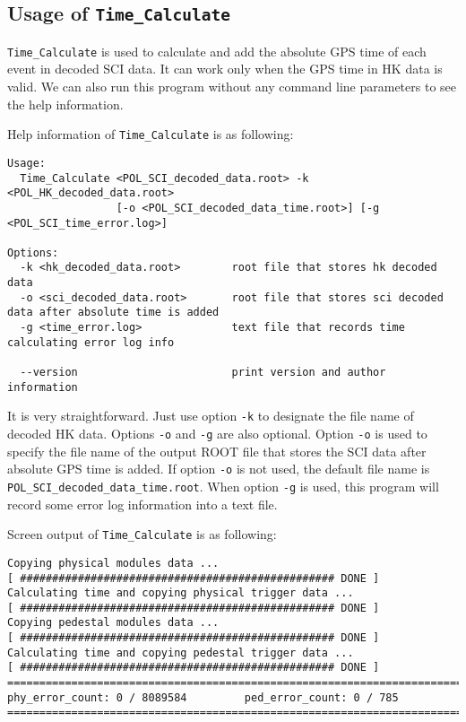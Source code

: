 \documentclass[a4paper, 12pt, onecolumn]{article}
\begin{document}
\subsection{Usage of \texttt{Time\_Calculate}}
\texttt{Time\_Calculate} is used to calculate and add the absolute GPS time of each event in decoded SCI data.
It can work only when the GPS time in HK data is valid. We can also run this program without any command line parameters to see the help information.

Help information of \texttt{Time\_Calculate} is as following:
\begin{Verbatim}[fontsize=\tiny, frame=single]
Usage:
  Time_Calculate <POL_SCI_decoded_data.root> -k <POL_HK_decoded_data.root>
                 [-o <POL_SCI_decoded_data_time.root>] [-g <POL_SCI_time_error.log>]

Options:
  -k <hk_decoded_data.root>        root file that stores hk decoded data
  -o <sci_decoded_data.root>       root file that stores sci decoded data after absolute time is added
  -g <time_error.log>              text file that records time calculating error log info

  --version                        print version and author information
\end{Verbatim}

It is very straightforward. Just use option \texttt{-k} to designate the file name of decoded HK data.
Options \texttt{-o} and \texttt{-g} are also optional. Option \texttt{-o} is used to specify the file name of the output ROOT file that stores the SCI data after
absolute GPS time is added. If option \texttt{-o} is not used, the default file name is \texttt{POL\_SCI\_decoded\_data\_time.root}.
When option \texttt{-g} is used, this program will record some error log information into a text file.

Screen output of \texttt{Time\_Calculate} is as following:

\begin{Verbatim}[fontsize=\scriptsize, frame=single]
Copying physical modules data ...
[ ################################################# DONE ] 
Calculating time and copying physical trigger data ...
[ ################################################# DONE ] 
Copying pedestal modules data ...
[ ################################################# DONE ] 
Calculating time and copying pedestal trigger data ...
[ ################################################# DONE ] 
================================================================================
phy_error_count: 0 / 8089584         ped_error_count: 0 / 785             
================================================================================
\end{Verbatim}
\end{document}
